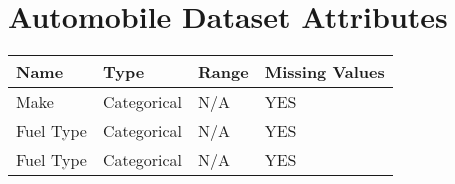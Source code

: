 \appendix
\chapter{Automobile Dataset Attributes}\label{attributes}
\begin{tabularx}{\textwidth}{|X|l|l|l|}
	\hline
	\textbf{Name} & \textbf{Type} & \textbf{Range} & \textbf{Missing Values} \\
	\hline
	Make          & Categorical   & N/A            & YES                     \\
	Fuel Type     & Categorical   & N/A            & YES                     \\
	Fuel Type     & Categorical   & N/A            & YES                     \\
	\hline
\end{tabularx}